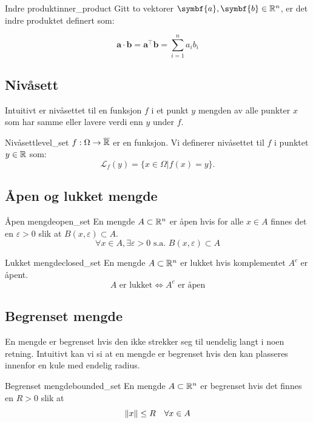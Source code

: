 \begin{definition}{Indre produkt}{inner_product}
  Gitt to vektorer \( \symbf{a}, \symbf{b} \in \R^n \), er det indre produktet definert som:

  \[
    \symbf{a} \cdot \symbf{b} = \symbf{a}^\top \symbf{b} = \sum_{i=1}^{n} a_i b_i
  \]

\end{definition}



\subsection{Nivåsett}
Intuitivt er nivåsettet til en funksjon \( f \) i et punkt \( y \) mengden av alle punkter \( x \) som har samme eller lavere verdi enn \( y \) under \( f \).
\begin{definition}{Nivåsett}{level_set}
  \(f: \Omega \to \overline{\mathbb{R}}\) er en funksjon. Vi definerer nivåsettet til \(f\) i punktet \(y \in \mathbb{R}\) som:
  \[
    \mathcal{L}_f(y) = \{x \in \Omega | f(x) = y\}.
  \]
\end{definition}

\subsection{Åpen og lukket mengde}

\begin{definition}{Åpen mengde}{open_set}
  En mengde \(A \subset \mathbb{R}^n\) er åpen hvis for alle \(x \in A\) finnes det en \(\varepsilon > 0\) slik at \(B(x, \varepsilon) \subset A\).
  \[
    \forall x \in A, \exists \varepsilon > 0 \text{ s.a. } B(x, \varepsilon) \subset A
  \]
\end{definition}

\begin{definition}{Lukket mengde}{closed_set}
  En mengde \(A \subset \mathbb{R}^n\) er lukket hvis komplementet \(A^c\) er åpent.
  \[
    A \text{ er lukket} \Leftrightarrow A^c \text{ er åpen}
  \]
\end{definition}

\subsection{Begrenset mengde}
En mengde er begrenset hvis den ikke strekker seg til uendelig langt i noen retning.
Intuitivt kan vi si at en mengde er begrenset hvis den kan plasseres innenfor en kule med endelig radius.

\begin{definition}{Begrenset mengde}{bounded_set}
  En mengde \(A \subset \mathbb{R}^n\) er begrenset hvis det finnes en \(R > 0\) slik at
  \[
    \lVert x\rVert \leq R \quad \forall x \in A
  \]
\end{definition}

